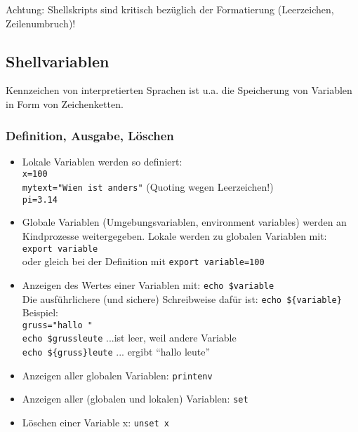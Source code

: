 \documentclass[11pt]{article}
\begin{document}
Achtung: Shellskripts sind kritisch bezüglich der Formatierung (Leerzeichen, Zeilenumbruch)!

\subsection{Shellvariablen}
Kennzeichen von interpretierten Sprachen ist u.a. die Speicherung von
Variablen in Form von Zeichenketten. 

\subsubsection{Definition, Ausgabe, Löschen}
\begin{itemize}
\item Lokale Variablen werden so definiert:\\
\texttt{x=100}\\
\texttt{mytext="Wien ist anders"} (Quoting wegen Leerzeichen!)\\
\texttt{pi=3.14}

\item Globale Variablen (Umgebungsvariablen, environment variables) werden
an Kindprozesse weitergegeben. Lokale werden zu globalen Variablen
mit:
\texttt{export variable}\\
oder gleich bei der Definition mit
\texttt{export variable=100}

\item Anzeigen des Wertes einer Variablen mit:
\texttt{echo \$variable}\\
Die ausführlichere (und sichere) Schreibweise dafür ist: 
\texttt{echo \$\{variable\}}\\

Beispiel:\\
\texttt{gruss="hallo "}\\
\texttt{echo \$grussleute} ...ist leer, weil andere Variable\\
\texttt{echo \$\{gruss\}leute} ... ergibt ``hallo leute'' 

\item Anzeigen aller globalen Variablen:
\texttt{printenv}

\item Anzeigen aller (globalen und lokalen) Variablen:
\texttt{set}

\item Löschen einer Variable x:
\texttt{unset x}
\end{itemize}
\end{document}
